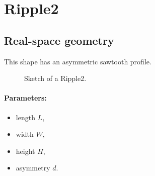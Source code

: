 

\newpage{\cleardoublepage}
\section{Ripple2}   

\subsection{Real-space geometry}
This shape has an asymmetric sawtooth profile.

\begin{figure}[ht]
\hfill
{}
\hfill
{}
\hfill
\caption{Sketch of a Ripple2.}
\label{fig:ripple2}
\end{figure}

\FloatBarrier

\paragraph{Parameters:}
\begin{itemize}
\item length $L$, 
\item width $W$, 
\item height $H$,
\item asymmetry $d$. 
\end{itemize}

